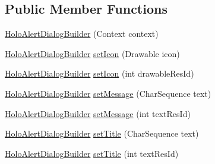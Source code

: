 \subsection*{Public Member Functions}
\begin{DoxyCompactItemize}
\item 
\hyperlink{classcom_1_1zia_1_1freshdocs_1_1widget_1_1_holo_alert_dialog_builder_a22458bb722fd8b3522730d74582e9304}{Holo\-Alert\-Dialog\-Builder} (Context context)
\item 
\hyperlink{classcom_1_1zia_1_1freshdocs_1_1widget_1_1_holo_alert_dialog_builder}{Holo\-Alert\-Dialog\-Builder} \hyperlink{classcom_1_1zia_1_1freshdocs_1_1widget_1_1_holo_alert_dialog_builder_ac8a22659ec12a04768f3eafe5149af50}{set\-Icon} (Drawable icon)
\item 
\hyperlink{classcom_1_1zia_1_1freshdocs_1_1widget_1_1_holo_alert_dialog_builder}{Holo\-Alert\-Dialog\-Builder} \hyperlink{classcom_1_1zia_1_1freshdocs_1_1widget_1_1_holo_alert_dialog_builder_a2502fd294f190b02df7eda82fee4e666}{set\-Icon} (int drawable\-Res\-Id)
\item 
\hyperlink{classcom_1_1zia_1_1freshdocs_1_1widget_1_1_holo_alert_dialog_builder}{Holo\-Alert\-Dialog\-Builder} \hyperlink{classcom_1_1zia_1_1freshdocs_1_1widget_1_1_holo_alert_dialog_builder_aaedcea2c2adc2f38531d2d4005e938a7}{set\-Message} (Char\-Sequence text)
\item 
\hyperlink{classcom_1_1zia_1_1freshdocs_1_1widget_1_1_holo_alert_dialog_builder}{Holo\-Alert\-Dialog\-Builder} \hyperlink{classcom_1_1zia_1_1freshdocs_1_1widget_1_1_holo_alert_dialog_builder_a5e494fbea36ac6d103bd5b5587650125}{set\-Message} (int text\-Res\-Id)
\item 
\hyperlink{classcom_1_1zia_1_1freshdocs_1_1widget_1_1_holo_alert_dialog_builder}{Holo\-Alert\-Dialog\-Builder} \hyperlink{classcom_1_1zia_1_1freshdocs_1_1widget_1_1_holo_alert_dialog_builder_a8b494f071e21f92cbf7ab17b73686960}{set\-Title} (Char\-Sequence text)
\item 
\hyperlink{classcom_1_1zia_1_1freshdocs_1_1widget_1_1_holo_alert_dialog_builder}{Holo\-Alert\-Dialog\-Builder} \hyperlink{classcom_1_1zia_1_1freshdocs_1_1widget_1_1_holo_alert_dialog_builder_a433bbe39ad448795398a17b09ebabe6e}{set\-Title} (int text\-Res\-Id)
\end{DoxyCompactItemize}


